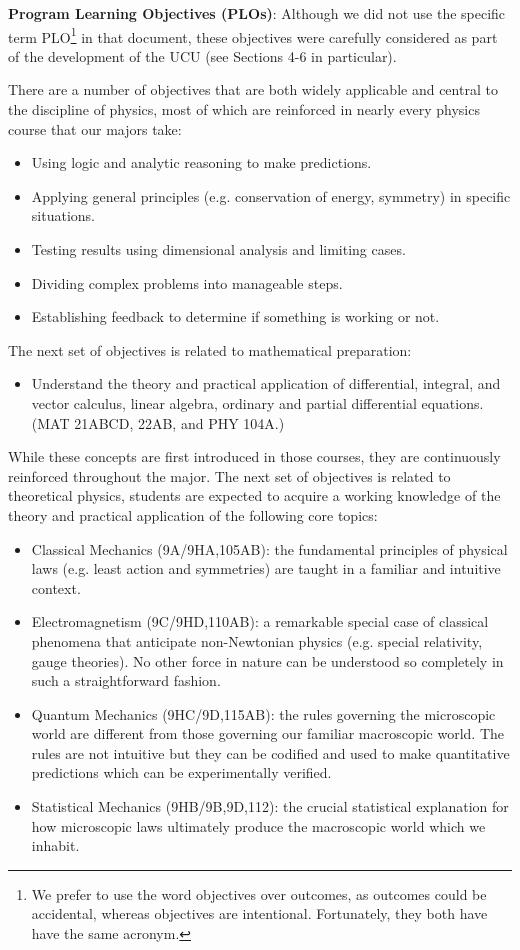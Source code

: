 \documentclass[12pt]{article}
\begin{document}
\noindent
{\bf Program Learning Objectives (PLOs)}: Although we did not use the
specific term PLO\footnote{We prefer to use the word objectives over
  outcomes, as outcomes could be accidental, whereas objectives are
  intentional.  Fortunately, they both have have the same acronym.} in
that document, these objectives were carefully considered as part of
the development of the UCU (see Sections 4-6 in particular).

There are a number of objectives that are both widely applicable and
central to the discipline of physics, most of which are reinforced in
nearly every physics course that our majors take:
\begin{itemize}
 \item Using logic and analytic reasoning to make predictions.  
 \item Applying general principles (e.g. conservation of energy,
   symmetry) in specific situations.
 \item Testing results using dimensional analysis and limiting cases. 
 \item Dividing complex problems into manageable steps.
 \item Establishing feedback to determine if something is working or not.
\end{itemize}  
The next set of objectives is related to mathematical preparation:
\begin{itemize}
\item Understand the theory and practical application of differential,
  integral, and vector calculus, linear algebra, ordinary and partial
  differential equations.  (MAT 21ABCD, 22AB, and PHY 104A.)
\end{itemize}
While these concepts are first introduced in those courses, they are
continuously reinforced throughout the major.  The next set of
objectives is related to theoretical physics, students are expected
to acquire a working knowledge of the theory and practical application
of the following core topics:
\begin{itemize}
 \item Classical Mechanics (9A/9HA,105AB): the fundamental principles
   of physical laws (e.g. least action and symmetries) are taught in a
   familiar and intuitive context.
 \item Electromagnetism (9C/9HD,110AB): a remarkable special case of
   classical phenomena that anticipate non-Newtonian physics
   (e.g. special relativity, gauge theories).  No other force in
   nature can be understood so completely in such a straightforward
   fashion.  
 \item Quantum Mechanics (9HC/9D,115AB): the rules governing the
   microscopic world are different from those governing our familiar
   macroscopic world.  The rules are not intuitive but they can be
   codified and used to make quantitative predictions which can be
   experimentally verified.
 \item Statistical Mechanics (9HB/9B,9D,112): the crucial statistical
   explanation for how microscopic laws ultimately produce the
   macroscopic world which we inhabit.
\end{itemize}
\end{document}
